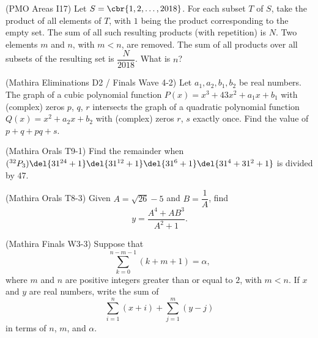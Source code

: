 (PMO Areas I17) Let $S = \cbr{1, 2, \ldots, 2018}$. For each subset $T$ of $S$, take the product of all elements of $T$, with $1$ being the product corresponding to the empty set. The sum of all such resulting products (with repetition) is $N$. Two elements $m$ and $n$, with $m < n$, are removed. The sum of all products over all subsets of the resulting set is $\dfrac{N}{2018}$. What is $n$?

(Mathira Eliminations D2 / Finals Wave 4-2) Let $a_1, a_2, b_1, b_2$ be real numbers. The graph of a cubic polynomial function $P(x) = x^3 + 43x^2 + a_1x + b_1$ with (complex) zeros $p$, $q$, $r$ intersects the graph of a quadratic polynomial function $Q(x) = x^2 + a_2x + b_2$ with (complex) zeros $r$, $s$ exactly once. Find the value of $p + q + pq + s$.

(Mathira Orals T9-1) Find the remainder when $(^{32}P_3)\del{31^{24} + 1}\del{31^{12} + 1}\del{31^6 + 1}\del{31^4 + 31^2 + 1}$ is divided by $47$.

(Mathira Orals T8-3) Given $A = \sqrt{26} - 5$ and $B = \dfrac1A$, find $$y = \dfrac{A^4 + AB^3}{A^2 + 1}.$$

(Mathira Finals W3-3) Suppose that $$\sum_{k=0}^{n-m-1} (k + m + 1) = \alpha,$$ where $m$ and $n$ are positive integers greater than or equal to $2$, with $m < n$. If $x$ and $y$ are real numbers, write the sum of $$\sum_{i=1}^n (x + i) + \sum_{j = 1}^m (y - j)$$ in terms of $n$, $m$, and $\alpha$.
